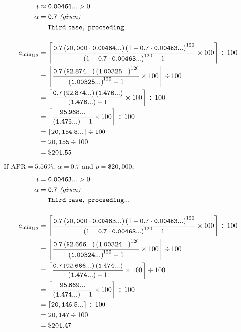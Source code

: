 \documentclass[12pt,letterpaper,oneside]{article}
\theoremstyle{remark} %
\begin{document}
	\begin{align*}
	i&\approx\mathtt{0.00464...}>0\\
	\alpha&=\mathtt{0.7}\ \textit{(given)}\\
	&\quad\;\mathtt{Third\ case,\ proceeding...}\\[12pt]
	a_{\rm{min_{120}}}&=\left\lceil{\frac{\mathtt{0.7}\left(\mathtt{20,000}\cdot\mathtt{0.00464...}\right)\base^{120}}{\base^{120}-1}\times 100}\right\rceil\div 100\\
	&=\left\lceil{\frac{\mathtt{0.7}\left(\mathtt{92.874...}\right)\left(\mathtt{1.00325...}\right)^{120}}{\left(\mathtt{1.00325...}\right)^{120}-1}\times 100}\right\rceil\div 100\\
	&=\left\lceil{\frac{\mathtt{0.7}\left(\mathtt{92.874...}\right)\left(\mathtt{1.476...}\right)}{\left(\mathtt{1.476...}\right)-1}\times 100}\right\rceil\div 100\\
	&=\left\lceil{\frac{\mathtt{95.968...}}{\left(\mathtt{1.476...}\right)-1}\times 100}\right\rceil\div 100\\
	&=\left\lceil{\mathtt{20,154.8...}}\right\rceil\div 100\\
	&=\mathtt{20,155}\div 100\\
	&=\mathtt{\$201.55}
	\end{align*}
	\newpage
	\renewcommand{\base}{\left(1+\mathtt{0.7}\cdot\mathtt{0.00463...}\right)}
	If $\mbox{APR}=5.56\%$, $\alpha=0.7$ and $p=\$20,000$,
	\begin{align*}
	i&=\mathtt{0.00463...}>0\\
	\alpha&=\mathtt{0.7}\ \textit{(given)}\\
	&\quad\;\mathtt{Third\ case,\ proceeding...}\\[12pt]
	a_{\rm{min_{120}}}&=\left\lceil{\frac{\mathtt{0.7}\left(\mathtt{20,000}\cdot\mathtt{0.00463...}\right)\base^{120}}{\base^{120}-1}\times 100}\right\rceil\div 100\\
	&=\left\lceil{\frac{\mathtt{0.7}\left(\mathtt{92.666...}\right)\left(\mathtt{1.00324...}\right)^{120}}{\left(\mathtt{1.00324...}\right)^{120}-1}\times 100}\right\rceil\div 100\\
	&=\left\lceil{\frac{\mathtt{0.7}\left(\mathtt{92.666...}\right)\left(\mathtt{1.474...}\right)}{\left(\mathtt{1.474...}\right)-1}\times 100}\right\rceil\div 100\\
	&=\left\lceil{\frac{\mathtt{95.669...}}{\left(\mathtt{1.474...}\right)-1}\times 100}\right\rceil\div 100\\
	&=\left\lceil{\mathtt{20,146.5...}}\right\rceil\div 100\\
	&=\mathtt{20,147}\div 100\\
	&=\mathtt{\$201.47}
	\end{align*}
\end{document}
